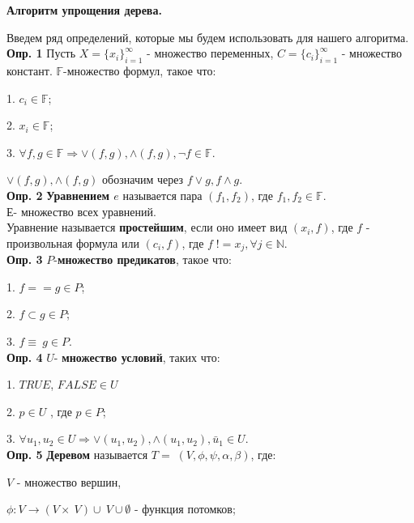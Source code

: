 \documentclass[12pt]{article}
\begin{document}
 
	\begin{center}
	{\bf\large Алгоритм упрощения дерева.}
	\end{center}
	Введем ряд определений, которые мы будем использовать для нашего алгоритма.
	\\
	
	{\bf Опр. 1} Пусть $X = \lbrace  x_{i}  \rbrace_{i=1}^{\infty} $ - множество переменных,
	$C = \lbrace  c_{i}  \rbrace_{i=1}^{\infty} $ - множество констант. $\mathbb{F}$-множество формул, такое что:
	
	1. $c_{i} \in \mathbb{F} $; 
	
	2. $x_{i} \in \mathbb{F} $; 
	
	3. $\forall f, g \in \mathbb{F} \Rightarrow \vee(f,g), \wedge(f,g), \neg f \in \mathbb{F}$.
	
	 $\vee(f,g), \wedge(f,g)$ обозначим через $f \vee g, f \wedge g$.
	\\

	{\bf Опр. 2} {\bf Уравнением  $e$} называется пара $(f_{1},f_{2})$, где $f_{1},f_{2} \in \mathbb{F}$.\\Е- множество всех уравнений.
	\\Уравнение называется {\bf простейшим}, если оно имеет вид $(x_{i}, f)$, где $f$ - произвольная формула или $(c_{i}, f)$, где $f \; != x_{j}, \forall j \in \mathbb{N}$.
	\\
	
	{\bf Опр. 3} $P$-{\bf множество предикатов}, такое что: 
	
	1. $f==g \in P$; 
	
    2. $f \subset g \in P$;
    
    3. $f \equiv \: g \in P$.
    \\
    
    {\bf Опр. 4}  $U$- {\bf множество условий}, таких что: 
    
    1. $TRUE$, $FALSE \in U$
    
    2. $p \in U$ , где $p \in P$;
    
    3. $\forall u_{1}, u_{2} \in U \Rightarrow \vee(u_{1},u_{2}), \wedge(u_{1},u_{2}), \bar u_{1} \in U$.
    \\
    
     \hypertarget{d5}{{\bf Опр. 5}} {\bf Деревом} называется $T = \; (V,\phi,\psi, \alpha, \beta)$, где: 
     
     $V$ - множество вершин,
     
      $\phi : V \rightarrow (V\times \:V)\cup \:V \cup \emptyset$ - функция потомков;
      
\end{document}
